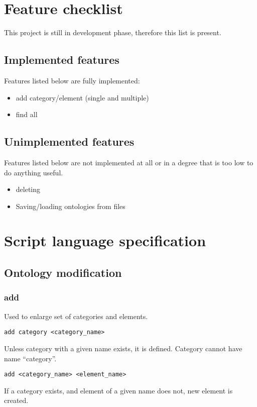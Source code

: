 \documentclass{article}
\begin{document}
\section{Feature checklist}

This project is still in development phase, therefore this list is present.

\subsection{Implemented features}
Features listed below are fully implemented:

\begin{itemize}
  \item add category/element (single and multiple)
  \item find all
\end{itemize}

\subsection{Unimplemented features}
Features listed below are not implemented at all or in a degree that is too low to do anything useful.

\begin{itemize}
  \item deleting
  \item Saving/loading ontologies from files
\end{itemize}

\section{Script language specification}

\subsection{Ontology modification}

\subsubsection{add}
Used to enlarge set of categories and elements.

\begin{verbatim}
add category <category_name>
\end{verbatim}
Unless category with a given name exists, it is defined. Category cannot 
have name ``category''.

\begin{verbatim}
add <category_name> <element_name>
\end{verbatim}
If a category exists, and element of a given name does not, new element is created.
\end{document}
